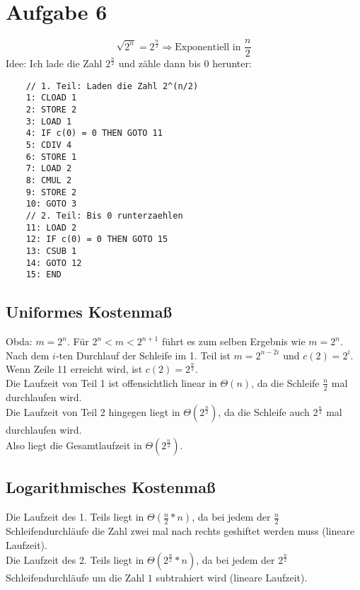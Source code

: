 \documentclass[a4paper,11pt]{scrartcl}
\begin{document}
	\newpage
	
	\section*{Aufgabe 6}
	\[\sqrt{2^n}=2^{\frac{n}{2}} \Rightarrow \text{Exponentiell in } \frac{n}{2}\]
	Idee: Ich lade die Zahl $2^{\frac{n}{2}}$ und zähle dann bis $0$ herunter:
	\begin{lstlisting}
	// 1. Teil: Laden die Zahl 2^(n/2)
	1: CLOAD 1
	2: STORE 2
	3: LOAD 1
	4: IF c(0) = 0 THEN GOTO 11
	5: CDIV 4
	6: STORE 1
	7: LOAD 2
	8: CMUL 2
	9: STORE 2
	10: GOTO 3
	// 2. Teil: Bis 0 runterzaehlen
	11: LOAD 2
	12: IF c(0) = 0 THEN GOTO 15
	13: CSUB 1
	14: GOTO 12
	15: END
	\end{lstlisting}
	
	\subsection*{Uniformes Kostenmaß}
	Obda: $m=2^n$. Für $2^n < m < 2^{n+1}$ führt es zum selben Ergebnis wie $m=2^n$.\\
	Nach dem $i$-ten Durchlauf der Schleife im 1. Teil ist $m=2^{n-2i}$ und $c(2) = 2^i$. \\
	Wenn Zeile 11 erreicht wird, ist $c(2) = 2^{\frac{n}{2}}$.\\
	Die Laufzeit von Teil 1 ist offensichtlich linear in $\Theta(n)$, da die Schleife $\frac{n}{2}$ mal durchlaufen wird.\\
	Die Laufzeit von Teil 2 hingegen liegt in $\Theta(2^{\frac{n}{2}})$, da die Schleife auch $2^{\frac{n}{2}}$ mal durchlaufen wird.\\
	Also liegt die Gesamtlaufzeit in $\Theta(2^{\frac{n}{2}})$.
	
	\subsection*{Logarithmisches Kostenmaß}
	Die Laufzeit des 1. Teils liegt in $\Theta(\frac{n}{2} * n)$, da bei jedem der $\frac{n}{2}$ Schleifendurchläufe die Zahl zwei mal nach rechts geshiftet werden muss (lineare Laufzeit). \\
	Die Laufzeit des 2. Teils liegt in $\Theta(2^{\frac{n}{2}} * n)$, da bei jedem der $2^{\frac{n}{2}}$ Schleifendurchläufe um die Zahl $1$ subtrahiert wird (lineare Laufzeit).
	
	\newpage
	
\end{document}
